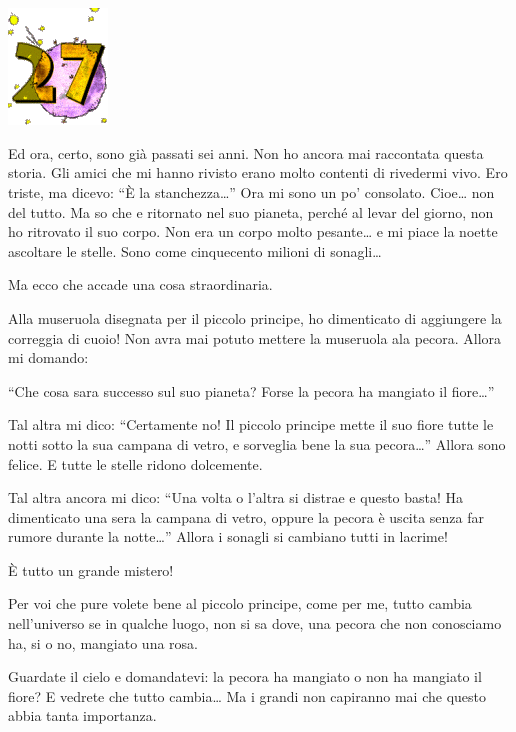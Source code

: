 \documentclass[11pt]{scrbook}
\begin{document}
\chapter{}
\begin{center}
\includegraphics{img/chapter27}
\end{center}

Ed ora, certo, sono già passati sei anni. Non ho ancora mai raccontata
questa storia. Gli amici che mi hanno rivisto erano molto contenti di
rivedermi vivo. Ero triste, ma dicevo: ``È la stanchezza\ldots{}'' Ora
mi sono un po' consolato. Cioe\ldots{} non del tutto. Ma so che e
ritornato nel suo pianeta, perché al levar del giorno, non ho ritrovato
il suo corpo. Non era un corpo molto pesante\ldots{} e mi piace la
noette ascoltare le stelle. Sono come cinquecento milioni di
sonagli\ldots{}

Ma ecco che accade una cosa straordinaria.

Alla museruola disegnata per il piccolo principe, ho dimenticato di
aggiungere la correggia di cuoio! Non avra mai potuto mettere la
museruola ala pecora. Allora mi domando:

``Che cosa sara successo sul suo pianeta? Forse la pecora ha mangiato il
fiore\ldots{}''

Tal altra mi dico: ``Certamente no! Il piccolo principe mette il suo
fiore tutte le notti sotto la sua campana di vetro, e sorveglia bene la
sua pecora\ldots{}'' Allora sono felice. E tutte le stelle ridono
dolcemente.

Tal altra ancora mi dico: ``Una volta o l'altra si distrae e questo
basta! Ha dimenticato una sera la campana di vetro, oppure la pecora è
uscita senza far rumore durante la notte\ldots{}'' Allora i sonagli si
cambiano tutti in lacrime!

È tutto un grande mistero!

Per voi che pure volete bene al piccolo principe, come per me, tutto
cambia nell'universo se in qualche luogo, non si sa dove, una pecora che
non conosciamo ha, si o no, mangiato una rosa.

Guardate il cielo e domandatevi: la pecora ha mangiato o non ha mangiato
il fiore? E vedrete che tutto cambia\ldots{} Ma i grandi non capiranno mai
che questo abbia tanta importanza.
\end{document}
